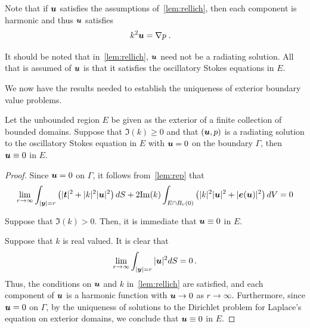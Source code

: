 \begin{remark} \label{rmk:harmu}
  Note that if ${\boldsymbol u}$ satisfies the assumptions
  of~\cref{lem:rellich}, then each component is harmonic
  and thus ${\boldsymbol u}$ satisfies
\begin{align}
k^2 {\boldsymbol u} &= \nabla p \label{eq:massconsred} \; .
\end{align}
\end{remark}

\begin{remark}
  It should be noted that in~\cref{lem:rellich}, ${\boldsymbol u}$ need
  not be a radiating solution. All that is assumed of ${\boldsymbol u}$
  is that it satisfies the oscillatory Stokes equations in $E$.
\end{remark}

We now have the results needed to establish the
uniqueness of exterior boundary value problems.

\begin{thrm}
  \label{thrm:unique_dir_ext}
  Let the unbounded region $E$ be given as the exterior
  of a finite collection of bounded domains.
  Suppose that $\Im(k)\geq 0$ and 
  that $({\boldsymbol u},p)$ is a radiating solution to the oscillatory Stokes
  equation in $E$ with ${\boldsymbol u} =0$ on the boundary $\Gamma$, then
  ${\boldsymbol u} \equiv 0$ in $E$.
\end{thrm}

\begin{proof}
Since ${\boldsymbol u} = 0$ on $\Gamma$, it follows from~\cref{lem:rep} that
\begin{equation}
\lim_{r\to\infty}
\int_{|{\boldsymbol y}|=r} \left( |{\boldsymbol t}|^2 + |k|^2 |{\boldsymbol u}|^2 \right) dS +
2 {\textrm{\textup{Im}}}(k) \int_{E \cap B_{r}(0)} \left(|k|^2 |{\boldsymbol u}|^2 + |{\boldsymbol e}({\boldsymbol u})|^2 \right)
dV = 0 \nonumber
\end{equation}

Suppose that $\Im(k) > 0$. Then, it is immediate that
${\boldsymbol u} \equiv 0$ in $E$.

Suppose that $k$ is real valued. It is clear that
\begin{equation}
\lim_{r\to\infty} \int_{|{\boldsymbol y}|=r} |{\boldsymbol u}|^2 dS = 0 \, . \nonumber
\end{equation}
Thus, the conditions on ${\boldsymbol u}$ and $k$ in~\cref{lem:rellich}
are satisfied, and each component of ${\boldsymbol u}$ is a harmonic function
with ${\boldsymbol u} \to 0$ as $r \to \infty$. Furthermore, since ${\boldsymbol u}=0$ on
$\Gamma$, by the uniqueness of solutions to the
Dirichlet problem for Laplace's equation
on exterior domains, we conclude that ${\boldsymbol u} \equiv 0$
in $E$.
\end{proof}

